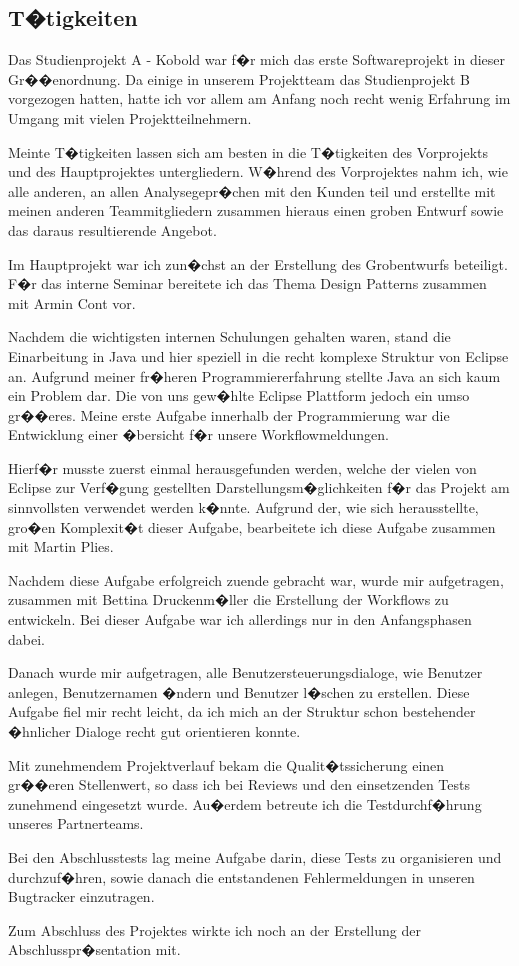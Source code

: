 \documentclass[a4paper,titlepage,12pt,ngerman]{scrbook}
\begin{document}

\subsection{T�tigkeiten}
Das Studienprojekt A - Kobold war f�r mich das erste Softwareprojekt in
dieser Gr��enordnung. Da einige in unserem Projektteam das Studienprojekt B
vorgezogen hatten, hatte ich vor allem am Anfang noch recht wenig Erfahrung
im Umgang mit vielen Projektteilnehmern.\par
Meinte T�tigkeiten lassen sich am besten in die T�tigkeiten des Vorprojekts
und des Hauptprojektes untergliedern. W�hrend des Vorprojektes nahm ich, wie
alle anderen, an allen Analysegepr�chen mit den Kunden teil und erstellte
mit meinen anderen Teammitgliedern zusammen hieraus einen groben Entwurf
sowie das daraus resultierende Angebot.\par
Im Hauptprojekt war ich zun�chst an der Erstellung des Grobentwurfs
beteiligt. F�r das interne Seminar bereitete ich das Thema Design Patterns
zusammen mit Armin Cont vor.\par
Nachdem die wichtigsten internen Schulungen gehalten waren, stand die
Einarbeitung in Java und hier speziell in die recht komplexe Struktur von
Eclipse an. Aufgrund meiner fr�heren Programmiererfahrung stellte Java an
sich kaum ein Problem dar. Die von uns gew�hlte Eclipse Plattform jedoch ein
umso gr��eres. Meine erste Aufgabe innerhalb der Programmierung war die
Entwicklung einer �bersicht f�r unsere Workflowmeldungen.\par
Hierf�r musste zuerst einmal herausgefunden werden, welche der vielen von
Eclipse zur Verf�gung gestellten Darstellungsm�glichkeiten f�r das Projekt
am sinnvollsten verwendet werden k�nnte. Aufgrund der, wie sich
herausstellte, gro�en Komplexit�t dieser Aufgabe, bearbeitete ich diese
Aufgabe zusammen mit Martin Plies.\par
Nachdem diese Aufgabe erfolgreich zuende gebracht war, wurde mir
aufgetragen, zusammen mit Bettina Druckenm�ller die Erstellung der Workflows
zu entwickeln. Bei dieser Aufgabe war ich allerdings nur in den
Anfangsphasen dabei.\par
Danach wurde mir aufgetragen, alle Benutzersteuerungsdialoge, wie Benutzer
anlegen, Benutzernamen �ndern und Benutzer l�schen zu erstellen. Diese
Aufgabe fiel mir recht leicht, da ich mich an der Struktur schon bestehender
�hnlicher Dialoge recht gut orientieren konnte.\par
Mit zunehmendem Projektverlauf bekam die Qualit�tssicherung einen gr��eren
Stellenwert, so dass ich bei Reviews und den einsetzenden Tests zunehmend
eingesetzt wurde. Au�erdem betreute ich die Testdurchf�hrung unseres
Partnerteams.\par
Bei den Abschlusstests lag meine Aufgabe darin, diese Tests zu organisieren
und durchzuf�hren, sowie danach die entstandenen Fehlermeldungen in unseren
Bugtracker einzutragen. \par
Zum Abschluss des Projektes wirkte ich noch an der Erstellung der
Abschlusspr�sentation mit.
\end{document}
